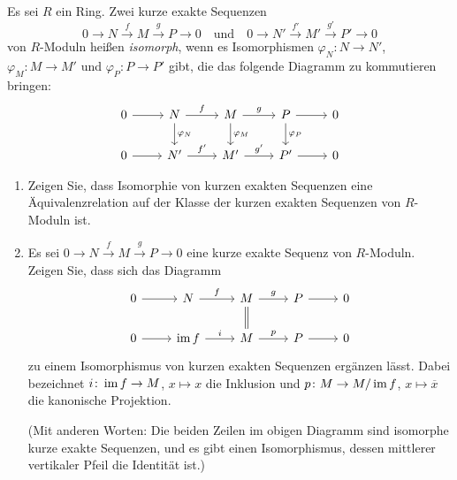 \begin{question}[subtitle = Isomorphie von kurzen exakten Sequenzen]
  \label{question: isomorpism of short exact sequences}
  Es sei $R$ ein Ring.
  Zwei kurze exakte Sequenzen
  \[
    0 \to N  \xrightarrow{f}  M  \xrightarrow{g}  P \to 0
    \quad\text{und}\quad
    0 \to N' \xrightarrow{f'} M' \xrightarrow{g'} P' \to 0
  \]
  von $R$-Moduln heißen \emph{isomorph}, wenn es Isomorphismen $\varphi_N \colon N \to N'$, $\varphi_M \colon M \to M'$ und $\varphi_P \colon P \to P'$ gibt, die das folgende Diagramm zu kommutieren bringen:
  \[
    \begin{tikzcd}[ampersand replacement = \&]
          0
          \arrow{r}
      \&  N
          \arrow{r}{f}
          \arrow{d}{\varphi_N}
      \&  M
          \arrow{r}{g}
          \arrow{d}{\varphi_M}
      \&  P
          \arrow{r}
          \arrow{d}{\varphi_P}
      \&  0
      \\
          0
          \arrow{r}
      \&  N'
          \arrow{r}{f'}
      \&  M'
          \arrow{r}{g'}
      \&  P'
          \arrow{r}
      \&  0
    \end{tikzcd}
  \]
  \begin{enumerate}
    \item
      Zeigen Sie, dass Isomorphie von kurzen exakten Sequenzen eine Äquivalenzrelation auf der Klasse der kurzen exakten Sequenzen von $R$-Moduln ist.
    \item
      Es sei $0 \to N \xrightarrow{f} M \xrightarrow{g} P \to 0$ eine kurze exakte Sequenz von $R$-Moduln.
      Zeigen Sie, dass sich das Diagramm
      \[
        \begin{tikzcd}[ampersand replacement = \&]
              0
              \arrow{r}
          \&  N
              \arrow{r}{f}
          \&  M
              \arrow{r}{g}
              \arrow[equal]{d}
          \&  P
              \arrow{r}
          \&  0
          \\
              0
              \arrow{r}
          \&  \im f
              \arrow{r}{i}
          \&  M
              \arrow{r}{p}
          \&  P
              \arrow{r}
          \&  0
        \end{tikzcd}
      \]
      zu einem Isomorphismus von kurzen exakten Sequenzen ergänzen lässt.
      Dabei bezeichnet $i \colon \operatorname{im} f \to M$, $x \mapsto x$ die Inklusion und $p \colon M \to M / \operatorname{im} f$, $x \mapsto \overline{x}$ die kanonische Projektion.
      
      (Mit anderen Worten:
       Die beiden Zeilen im obigen Diagramm sind isomorphe kurze exakte Sequenzen, und es gibt einen Isomorphismus, dessen mittlerer vertikaler Pfeil die Identität ist.)
  \end{enumerate}
\end{question}


